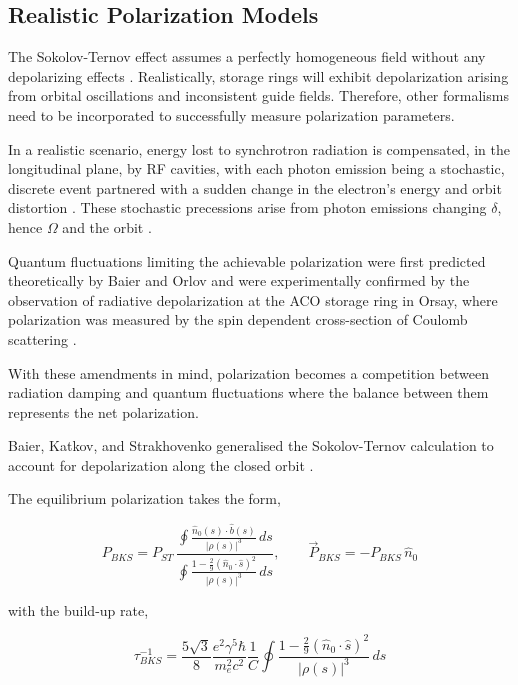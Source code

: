 \documentclass[%
 aip,
 amsmath,amssymb,
 reprint,%
superscriptaddress
]{revtex4-2}
\begin{document}
\subsection{ Realistic Polarization Models}

The Sokolov-Ternov effect assumes a perfectly homogeneous field without any depolarizing effects \cite{derbenev_kondratenko_1973}. Realistically, storage rings will exhibit depolarization arising from orbital oscillations and inconsistent guide fields. Therefore, other formalisms need to be incorporated to successfully measure polarization parameters.

In a realistic scenario, energy lost to synchrotron radiation is compensated, in the longitudinal plane, by RF cavities, with each photon emission being a stochastic, discrete event partnered with a sudden change in the electron’s energy and orbit distortion \cite{zara_berglund_2001}. These stochastic precessions arise from photon emissions changing $\delta$, hence $\Omega$ and the orbit \cite{zara_berglund_2001}.

Quantum fluctuations limiting the achievable polarization were first predicted theoretically by Baier and Orlov \cite{Baier1965tr} and were experimentally confirmed by the observation of radiative depolarization at the ACO storage ring in Orsay, where polarization was measured by the spin dependent cross-section of Coulomb scattering \cite{inproceedings}.

With these amendments in mind, polarization becomes a competition between radiation damping and quantum fluctuations where the balance between them represents the net polarization.

Baier, Katkov, and Strakhovenko generalised the Sokolov-Ternov calculation to account for depolarization along the closed orbit \cite{baier_katkov_strakhovenko_1970}.

The equilibrium polarization takes the form\cite{baier_katkov_strakhovenko_1970},

\begin{equation}
P_{BKS} = P_{ST}\,\frac{\displaystyle\oint \frac{\hat{n}_0(s)\cdot\hat{b}(s)}{|\rho(s)|^3}\,ds}{\displaystyle\oint \frac{1-\frac{2}{9}(\hat{n}_0\cdot\hat{s})^2}{|\rho(s)|^3}\,ds}, \qquad \vec{P}_{BKS} = -P_{BKS}\,\hat{n}_0
\end{equation}

with the build-up rate,

\begin{equation}
\tau_{BKS}^{-1} = \frac{5\sqrt{3}}{8}\frac{e^2\gamma^5\hbar}{m_e^2c^2}\frac{1}{C}\oint\frac{1-\frac{2}{9}(\hat{n}_0\cdot\hat{s})^2}{|\rho(s)|^3}\,ds
\end{equation}
\end{document}
